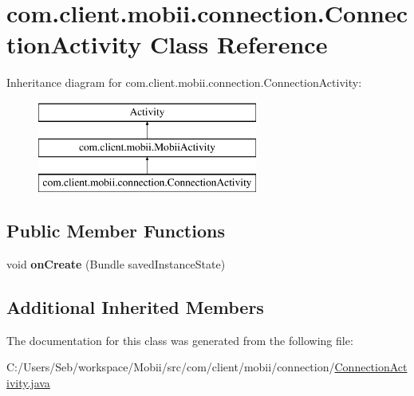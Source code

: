 \hypertarget{classcom_1_1client_1_1mobii_1_1connection_1_1_connection_activity}{\section{com.\-client.\-mobii.\-connection.\-Connection\-Activity Class Reference}
\label{classcom_1_1client_1_1mobii_1_1connection_1_1_connection_activity}
}
Inheritance diagram for com.\-client.\-mobii.\-connection.\-Connection\-Activity\-:\begin{figure}[H]
\begin{center}
\leavevmode
\includegraphics[height=3.000000cm]{classcom_1_1client_1_1mobii_1_1connection_1_1_connection_activity}
\end{center}
\end{figure}
\subsection*{Public Member Functions}
\begin{DoxyCompactItemize}
\item 
\hypertarget{classcom_1_1client_1_1mobii_1_1connection_1_1_connection_activity_ae4ec020119707b776addf8882bd44482}{void {\bfseries on\-Create} (Bundle saved\-Instance\-State)}\label{classcom_1_1client_1_1mobii_1_1connection_1_1_connection_activity_ae4ec020119707b776addf8882bd44482}

\end{DoxyCompactItemize}
\subsection*{Additional Inherited Members}


The documentation for this class was generated from the following file\-:\begin{DoxyCompactItemize}
\item 
C\-:/\-Users/\-Seb/workspace/\-Mobii/src/com/client/mobii/connection/\hyperlink{_connection_activity_8java}{Connection\-Activity.\-java}\end{DoxyCompactItemize}
